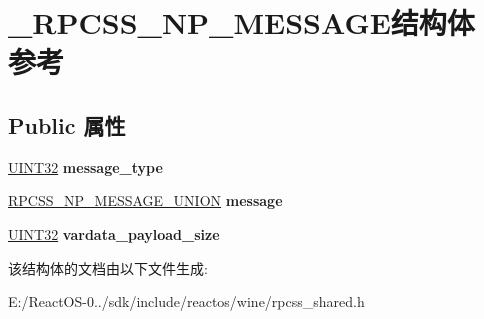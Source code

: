 \hypertarget{struct___r_p_c_s_s___n_p___m_e_s_s_a_g_e}{}\section{\+\_\+\+R\+P\+C\+S\+S\+\_\+\+N\+P\+\_\+\+M\+E\+S\+S\+A\+G\+E结构体 参考}
\label{struct___r_p_c_s_s___n_p___m_e_s_s_a_g_e}
\subsection*{Public 属性}
\begin{DoxyCompactItemize}
\item 
\mbox{\label{struct___r_p_c_s_s___n_p___m_e_s_s_a_g_e_a0df8690b45c92afff57b590cf1db101c}} 
\hyperlink{_processor_bind_8h_ae1e6edbbc26d6fbc71a90190d0266018}{U\+I\+N\+T32} {\bfseries message\+\_\+type}
\item 
\mbox{\label{struct___r_p_c_s_s___n_p___m_e_s_s_a_g_e_a42c690185df9502d59dd2e8e69f0bc66}} 
\hyperlink{union_r_p_c_s_s___n_p___m_e_s_s_a_g_e___u_n_i_o_n}{R\+P\+C\+S\+S\+\_\+\+N\+P\+\_\+\+M\+E\+S\+S\+A\+G\+E\+\_\+\+U\+N\+I\+ON} {\bfseries message}
\item 
\mbox{\label{struct___r_p_c_s_s___n_p___m_e_s_s_a_g_e_ae57cc2022008bfcd04377c691205399b}} 
\hyperlink{_processor_bind_8h_ae1e6edbbc26d6fbc71a90190d0266018}{U\+I\+N\+T32} {\bfseries vardata\+\_\+payload\+\_\+size}
\end{DoxyCompactItemize}


该结构体的文档由以下文件生成\+:\begin{DoxyCompactItemize}
\item 
E\+:/\+React\+O\+S-\/0../sdk/include/reactos/wine/rpcss\+\_\+shared.\+h\end{DoxyCompactItemize}
